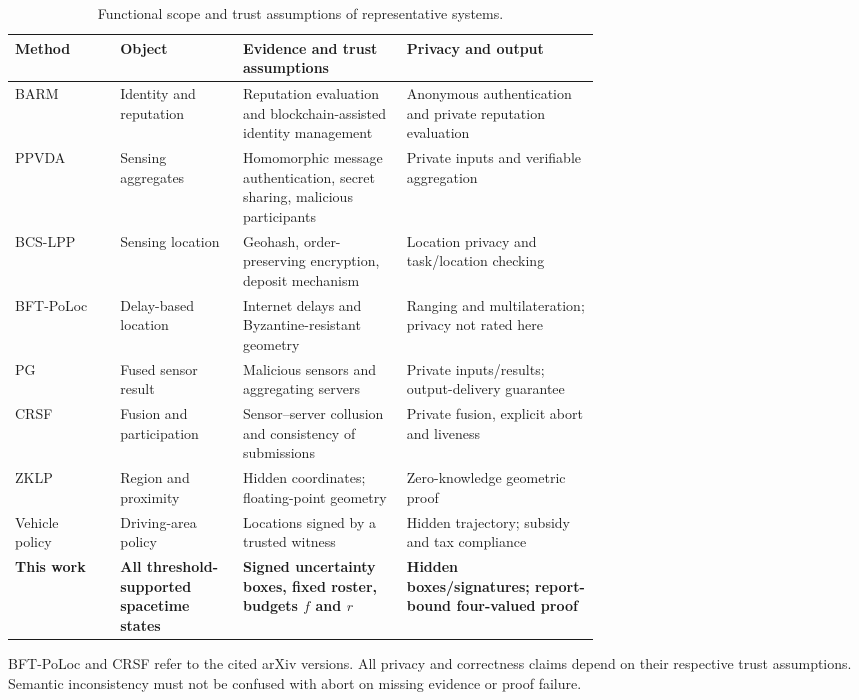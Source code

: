 \documentclass[pdflatex,iicol,sn-mathphys-num]{sn-jnl}
\theoremstyle{thmstyleone}
\begin{document}
\begin{table}[t]\centering\footnotesize
\caption{Functional scope and trust assumptions of representative systems.}\label{tab:related-work}
\begin{tabularx}{\linewidth}{@{}p{0.18\linewidth}p{0.21\linewidth}p{0.29\linewidth}X@{}}
\toprule Method & Object & Evidence and trust assumptions & Privacy and output\\\midrule
BARM~\citep{Zheng2025BARM} & Identity and reputation & Reputation evaluation and blockchain-assisted identity management & Anonymous authentication and private reputation evaluation\\
PPVDA~\citep{Zhou2024} & Sensing aggregates & Homomorphic message authentication, secret sharing, malicious participants & Private inputs and verifiable aggregation\\
BCS-LPP~\citep{Shen2024} & Sensing location & Geohash, order-preserving encryption, deposit mechanism & Location privacy and task/location checking\\
BFT-PoLoc~\citep{BFTPoLoc} & Delay-based location & Internet delays and Byzantine-resistant geometry & Ranging and multilateration; privacy not rated here\\
PG~\citep{PG} & Fused sensor result & Malicious sensors and aggregating servers & Private inputs/results; output-delivery guarantee\\
CRSF~\citep{CRSF} & Fusion and participation & Sensor--server collusion and consistency of submissions & Private fusion, explicit abort and liveness\\
ZKLP~\citep{ZKLP} & Region and proximity & Hidden coordinates; floating-point geometry & Zero-knowledge geometric proof\\
Vehicle policy~\citep{VehiclePolicy} & Driving-area policy & Locations signed by a trusted witness & Hidden trajectory; subsidy and tax compliance\\
\textbf{This work} & \textbf{All threshold-supported spacetime states} & \textbf{Signed uncertainty boxes, fixed roster, budgets $f$ and $r$} & \textbf{Hidden boxes/signatures; report-bound four-valued proof}\\\bottomrule
\end{tabularx}
\par\smallskip\raggedright\footnotesize BFT-PoLoc and CRSF refer to the cited arXiv versions. All privacy and correctness claims depend on their respective trust assumptions. Semantic inconsistency must not be confused with abort on missing evidence or proof failure.
\end{table}
\end{document}
